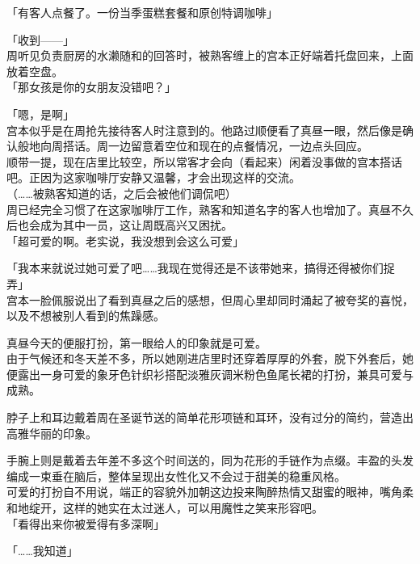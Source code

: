 「有客人点餐了。一份当季蛋糕套餐和原创特调咖啡」

「收到——」\\

周听见负责厨房的水濑随和的回答时，被熟客缠上的宫本正好端着托盘回来，上面放着空盘。\\

「那女孩是你的女朋友没错吧？」

「嗯，是啊」\\

宫本似乎是在周抢先接待客人时注意到的。他路过顺便看了真昼一眼，然后像是确认般地向周搭话。周一边留意着空位和现在的点餐情况，一边点头回应。\\

顺带一提，现在店里比较空，所以常客才会向（看起来）闲着没事做的宫本搭话吧。正因为这家咖啡厅安静又温馨，才会出现这样的交流。\\

（……被熟客知道的话，之后会被他们调侃吧）\\

周已经完全习惯了在这家咖啡厅工作，熟客和知道名字的客人也增加了。真昼不久后也会成为其中一员，这让周既高兴又困扰。\\

「超可爱的啊。老实说，我没想到会这么可爱」

「我本来就说过她可爱了吧……我现在觉得还是不该带她来，搞得还得被你们捉弄」\\

宫本一脸佩服说出了看到真昼之后的感想，但周心里却同时涌起了被夸奖的喜悦，以及不想被别人看到的焦躁感。

真昼今天的便服打扮，第一眼给人的印象就是可爱。\\

由于气候还和冬天差不多，所以她刚进店里时还穿着厚厚的外套，脱下外套后，她便露出一身可爱的象牙色针织衫搭配淡雅灰调米粉色鱼尾长裙的打扮，兼具可爱与成熟。

脖子上和耳边戴着周在圣诞节送的简单花形项链和耳环，没有过分的简约，营造出高雅华丽的印象。

手腕上则是戴着去年差不多这个时间送的，同为花形的手链作为点缀。丰盈的头发编成一束垂在脑后，整体呈现出女性化又不会过于甜美的稳重风格。\\

可爱的打扮自不用说，端正的容貌外加朝这边投来陶醉热情又甜蜜的眼神，嘴角柔和地绽开，这样的她实在太过迷人，可以用魔性之笑来形容吧。\\

「看得出来你被爱得有多深啊」

「……我知道」

